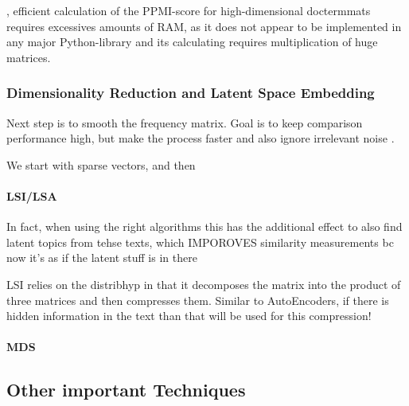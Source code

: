 , efficient calculation of the PPMI-score for high-dimensional \glspl{doctermmat} requires excessives amounts of RAM, as it does not appear to be implemented in any major Python-library and its calculating requires multiplication of huge matrices.


\subsubsection{Dimensionality Reduction and Latent Space Embedding}
\label{sec:dim_red}

Next step is to smooth the frequency matrix. Goal is to keep comparison performance high, but make the  process faster and also ignore irrelevant noise \cite{Turney2010}.

We start with sparse vectors, and then  \cite{Derrac2015}


\paragraph*{LSI/LSA}

\textcite{Deerwester}

In fact, when using the right algorithms this has the additional effect to also find latent topics from tehse texts, which IMPOROVES similarity measurements bc now it's as if the latent stuff is in there

LSI relies on the \gls{distribhyp} in that it decomposes the matrix into the product of three matrices and then compresses them. Similar to AutoEncoders, if there is hidden information in the text than that will be used for this compression! 

\paragraph*{MDS}
\label{sec:mds}


\subsection{Other important Techniques}



